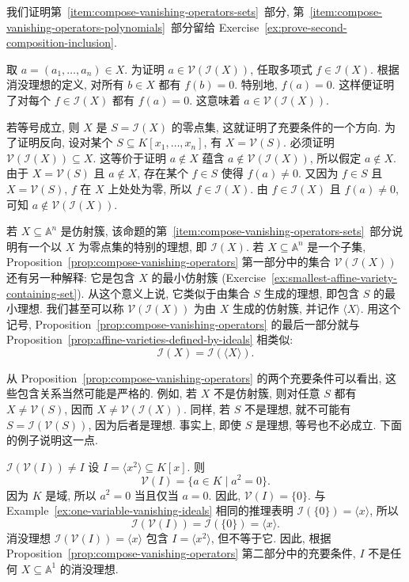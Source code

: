 \begin{Proof}
  我们证明第~\ref{item:compose-vanishing-operators-sets}~部分, 第~\ref{item:compose-vanishing-operators-polynomials}~部分留给 Exercise~\ref{ex:prove-second-composition-inclusion}.

  取 $a=(a_{1},\ldots,a_{n})\in X$. 为证明 $a\in\mathcal{V}(\mathcal{I}(X))$, 任取多项式 $f\in\mathcal{I}(X)$. 根据消没理想的定义, 对所有 $b\in X$ 都有 $f(b)=0$. 特别地, $f(a)=0$. 这样便证明了对每个 $f\in\mathcal{I}(X)$ 都有 $f(a)=0$. 这意味着 $a\in\mathcal{V}(\mathcal{I}(X))$.

  若等号成立, 则 $X$ 是 $S=\mathcal{I}(X)$ 的零点集, 这就证明了充要条件的一个方向. 为了证明反向, 设对某个 $S\subseteq K[x_{1},\ldots,x_{n}]$, 有 $X=\mathcal{V}(S)$. 必须证明 $\mathcal{V}(\mathcal{I}(X))\subseteq X$. 这等价于证明 $a\notin X$ 蕴含 $a\notin\mathcal{V}(\mathcal{I}(X))$, 所以假定 $a\notin X$. 由于 $X=\mathcal{V}(S)$ 且 $a\notin X$, 存在某个 $f\in S$ 使得 $f(a)\ne0$. 又因为 $f\in S$ 且 $X=\mathcal{V}(S)$, $f$ 在 $X$ 上处处为零, 所以 $f\in\mathcal{I}(X)$. 由 $f\in\mathcal{I}(X)$ 且 $f(a)\ne0$, 可知 $a\notin\mathcal{V}(\mathcal{I}(X))$.
\end{Proof}

\BookPairedNoteLeft
  {若 $X\subseteq\mathbb{A}^{n}$ 是仿射簇, 该命题的第~\ref{item:compose-vanishing-operators-sets}~部分说明有一个以 $X$ 为零点集的特别的理想, 即 $\mathcal{I}(X)$.}
  {若 $X\subseteq\mathbb{A}^{n}$ 是一个子集, Proposition~\ref{prop:compose-vanishing-operators} 第一部分中的集合 $\mathcal{V}(\mathcal{I}(X))$ 还有另一种解释: 它是包含 $X$ 的最小仿射簇 (Exercise~\ref{ex:smallest-affine-variety-containing-set}). 从这个意义上说, 它类似于由集合 $S$ 生成的理想, 即包含 $S$ 的最小理想.}
\noindent 我们甚至可以称 $\mathcal{V}(\mathcal{I}(X))$ 为\textquotedbl{}由 $X$ 生成的仿射簇\textquotedbl{}, 并记作 $\langle X\rangle$. 用这个记号, Proposition~\ref{prop:compose-vanishing-operators} 的最后一部分就与 Proposition~\ref{prop:affine-varieties-defined-by-ideals} 相类似:
\[
  \mathcal{I}(X)=\mathcal{I}(\langle X\rangle).
\]

从 Proposition~\ref{prop:compose-vanishing-operators} 的两个充要条件可以看出, 这些包含关系当然可能是严格的. 例如, 若 $X$ 不是仿射簇, 则对任意 $S$ 都有 $X\ne\mathcal{V}(S)$, 因而 $X\ne\mathcal{V}(\mathcal{I}(X))$. 同样, 若 $S$ 不是理想, 就不可能有 $S=\mathcal{I}(\mathcal{V}(S))$, 因为后者是理想. 事实上, 即使 $S$ 是理想, 等号也不必成立. 下面的例子说明这一点.

\begin{Example}{$\mathcal{I}(\mathcal{V}(I))\ne I$}\leavevmode\label{ex:square-ideal-not-vanishing-ideal}
  设 $I=\langle x^{2}\rangle\subseteq K[x]$. 则
  \[
    \mathcal{V}(I)=\{a\in K\mid a^{2}=0\}.
  \]
  因为 $K$ 是域, 所以 $a^{2}=0$ 当且仅当 $a=0$. 因此, $\mathcal{V}(I)=\{0\}$. 与 Example~\ref{ex:one-variable-vanishing-ideals} 相同的推理表明 $\mathcal{I}(\{0\})=\langle x\rangle$, 所以
  \[
    \mathcal{I}(\mathcal{V}(I))=\mathcal{I}(\{0\})=\langle x\rangle.
  \]
  消没理想 $\mathcal{I}(\mathcal{V}(I))=\langle x\rangle$ 包含 $I=\langle x^{2}\rangle$, 但不等于它. 因此, 根据 Proposition~\ref{prop:compose-vanishing-operators} 第二部分中的充要条件, $I$ 不是任何 $X\subseteq\mathbb{A}^{1}$ 的消没理想.
\end{Example}

